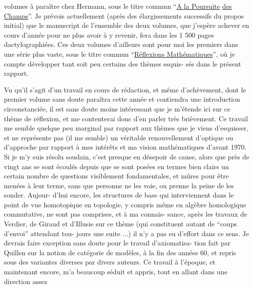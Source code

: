 
volumes à paraître chez Hermann, sous le titre commun ``\uline{A la Poursuite}
\uline{des Champs}''. Je prévois actuellement (après des élargissements
successifs du propos initial) que le manuscript de l'ensemble des
deux volumes, que j'espère achever en cours d'année pour ne plus
avoir à y revenir, fera dans les 1 500 pages dactylographiées.
Ces deux volumes d'ailleurs sont pour moi les premiers dans une
série plus vaste, sous le titre commun ``\uline{Réflexions Mathématiques}'',
où je compte développer tant soit peu certains des thèmes esquis-%
sés dans le présent rapport.

Vu qu'il s'agit d'un travail en cours de rédaction,
et même d'achèvement, dont le premier volume sans doute paraîtra
cette année et contiendra une introduction circonstanciée, il
est sans doute moins intéressant que je m'étende ici sur ce thème
de réflexion, et me contenterai donc d'en parler très brièvement.
Ce travail me semble quelque peu marginal par rapport aux thèmes
que je viens d'esquisser, et ne représente pas (il me semble) un
véritable renouvellement d'optique ou d'approche par rapport à
mes intérêts et ma vision mathématiques d'avant 1970. Si je m'y
suis résolu soudain, c'est presque en désepoir de cause, alors
que près de vingt ans se sont écoulés depuis que se sont posées
en termes bien clairs un certain nombre de questions visiblement
fondamentales, et mûres pour être menées à leur terme, sans que
personne ne les voie, ou prenne la peine de les sonder. Aujour-%
d'hui encore, les structures de base qui interviennent dans le
point de vue homotopique en topologie, y compris même en algèbre
homologique commutative, ne sont pas comprises, et à ma connais-%
sance, après les travaux de Verdier, de Giraud et d'Illusie sur
ce thème (qui constituent autant de ``coups d'envoi'' attendant tou-%
jours une suite ...) il n'y a pas eu d'effort dans ce sens. Je
devrais faire exception sans doute pour le travail d'axiomatisa-%
tion fait par Quillen sur la notion de catégorie de modèles, à
la fin des années 60, et repris sous des variantes diverses par
divers auteurs. Ce travail à l'époque, et maintenant encore, m'a
beaucoup séduit et appris, tout en allant dans une direction assez

